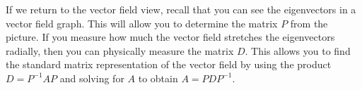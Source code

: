 \documentclass[10pt]{article}
\theoremstyle{plain}
\theoremstyle{box}
\begin{document}
If we return to the vector field view, recall that you can see the eigenvectors in a vector field graph. This will allow you to determine the matrix $P$ from the picture. If you measure how much the vector field stretches the eigenvectors radially, then you can physically measure the matrix $D$.  This allows you to find the standard matrix representation of the vector field by using the product $D=P^{-1}AP$ and solving for $A$ to obtain $A=PDP^{-1}$. 

\end{document}
